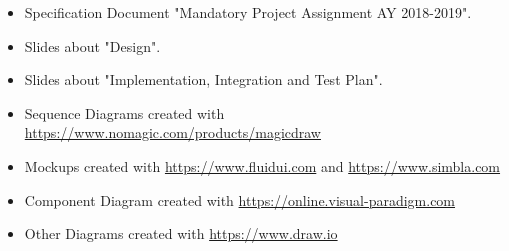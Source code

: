 \begin{itemize}

\item Specification Document "Mandatory Project Assignment AY 2018-2019".

\item Slides about "Design".

\item Slides about "Implementation, Integration and Test Plan".

\item Sequence Diagrams created with \url{https://www.nomagic.com/products/magicdraw}

\item Mockups created with \url{https://www.fluidui.com} and \url{https://www.simbla.com}

\item Component Diagram created with \url{https://online.visual-paradigm.com}

\item Other Diagrams created with \url{https://www.draw.io}

\end{itemize}